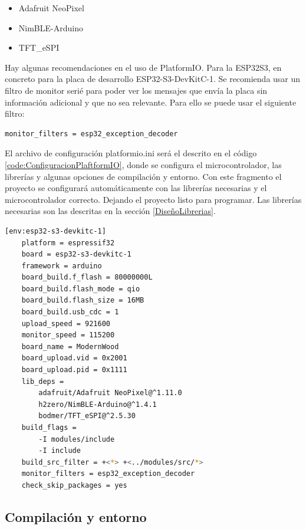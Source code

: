 \begin{itemize}
\item Adafruit NeoPixel
\item NimBLE-Arduino
\item TFT\_eSPI
\end{itemize}
\label{LibreriasPlatformIO}

Hay algunas recomendaciones en el uso de PlatformIO. Para la ESP32S3, en concreto para la placa de desarrollo ESP32-S3-DevKitC-1. Se recomienda usar un filtro de monitor serié para poder ver los mensajes que envía la placa sin información adicional y que no sea relevante. Para ello se puede usar el siguiente filtro:

\begin{lstlisting}[style=console, language=bash, caption={Filtro recomendado de PlatformIO}, label={code:FiltroEspecial}]
monitor_filters = esp32_exception_decoder
\end{lstlisting}
\newpage
El archivo de configuración platformio.ini será el descrito en el código \ref{code:ConfiguracionPlaftformIO}, donde se configura el microcontrolador, las librerías y algunas opciones de compilación y entorno. Con este fragmento el proyecto se configurará automáticamente con las librerías necesarias y el microcontrolador correcto. Dejando el proyecto listo para programar. Las librerías necesarias son las descritas en la sección \ref{DiseñoLibrerias}.

\begin{lstlisting}[style=console, language=bash, caption={Configuracion PlatformIO}, label={code:ConfiguracionPlaftformIO}]
    [env:esp32-s3-devkitc-1]
    platform = espressif32
    board = esp32-s3-devkitc-1
    framework = arduino
    board_build.f_flash = 80000000L
    board_build.flash_mode = qio
    board_build.flash_size = 16MB
    board_build.usb_cdc = 1
    upload_speed = 921600
    monitor_speed = 115200
    board_name = ModernWood
    board_upload.vid = 0x2001
    board_upload.pid = 0x1111
    lib_deps = 
        adafruit/Adafruit NeoPixel@^1.11.0
        h2zero/NimBLE-Arduino@^1.4.1
        bodmer/TFT_eSPI@^2.5.30
    build_flags =
        -I modules/include
        -I include
    build_src_filter = +<*> +<../modules/src/*>
    monitor_filters = esp32_exception_decoder
    check_skip_packages = yes
\end{lstlisting}

\subsection{Compilación y entorno}

